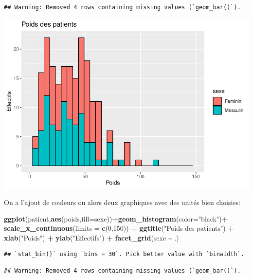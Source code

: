 \documentclass[
]{book}
\newenvironment{Shaded}{\begin{snugshade}}{\end{snugshade}}
\newcommand{\AttributeTok}[1]{\textcolor[rgb]{0.13,0.29,0.53}{#1}}
\newcommand{\DecValTok}[1]{\textcolor[rgb]{0.00,0.00,0.81}{#1}}
\newcommand{\FunctionTok}[1]{\textcolor[rgb]{0.13,0.29,0.53}{\textbf{#1}}}
\newcommand{\NormalTok}[1]{#1}
\newcommand{\SpecialCharTok}[1]{\textcolor[rgb]{0.81,0.36,0.00}{\textbf{#1}}}
\newcommand{\StringTok}[1]{\textcolor[rgb]{0.31,0.60,0.02}{#1}}
\begin{document}
\begin{verbatim}
## Warning: Removed 4 rows containing missing values (`geom_bar()`).
\end{verbatim}

\includegraphics{_main_files/figure-latex/ggplot8-1.pdf}

On a l'ajout de couleurs ou alors deux graphiques avec des unités bien choisies:

\begin{Shaded}
\begin{Highlighting}[]
\FunctionTok{ggplot}\NormalTok{(patient,}\FunctionTok{aes}\NormalTok{(poids,}\AttributeTok{fill=}\NormalTok{sexe))}\SpecialCharTok{+}\FunctionTok{geom\_histogram}\NormalTok{(}\AttributeTok{color=}\StringTok{"black"}\NormalTok{)}\SpecialCharTok{+}
  \FunctionTok{scale\_x\_continuous}\NormalTok{(}\AttributeTok{limits =} \FunctionTok{c}\NormalTok{(}\DecValTok{0}\NormalTok{,}\DecValTok{150}\NormalTok{)) }\SpecialCharTok{+} 
  \FunctionTok{ggtitle}\NormalTok{(}\StringTok{"Poids des patients"}\NormalTok{) }\SpecialCharTok{+} 
  \FunctionTok{xlab}\NormalTok{(}\StringTok{"Poids"}\NormalTok{) }\SpecialCharTok{+} 
  \FunctionTok{ylab}\NormalTok{(}\StringTok{"Effectifs"}\NormalTok{) }\SpecialCharTok{+}
  \FunctionTok{facet\_grid}\NormalTok{(sexe }\SpecialCharTok{\textasciitilde{}}\NormalTok{ .)}
\end{Highlighting}
\end{Shaded}

\begin{verbatim}
## `stat_bin()` using `bins = 30`. Pick better value with `binwidth`.
\end{verbatim}

\begin{verbatim}
## Warning: Removed 4 rows containing missing values (`geom_bar()`).
\end{verbatim}
\end{document}
